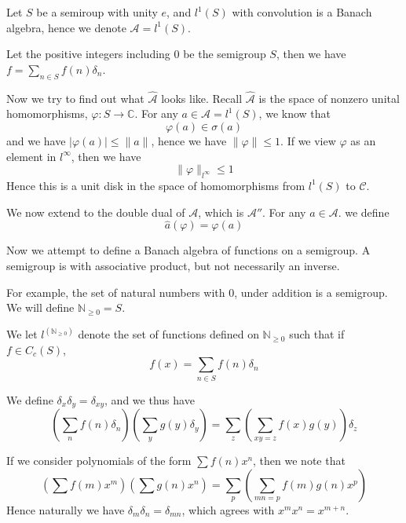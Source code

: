 Let $S$ be a semiroup with unity $e$, and $l^1(S)$ with convolution is a Banach algebra, hence we denote $\mathcal{A}=l^1(S)$.
\begin{example}
    Let the positive integers including 0 be the semigroup $S$, then we have $f=\sum_{n\in S}f(n)\delta_n$.
\end{example}
Now we try to find out what $\widehat{\mathcal{A}}$ looks like. Recall $\widehat{\mathcal{A}}$ is the space of nonzero unital homomorphisms, $\varphi:S\to\mathbb{C}$. For any $a\in\mathcal{A}=l^1(S)$, we know that
\begin{equation*}
    \varphi(a)\in\sigma(a)
\end{equation*}
and we have $|\varphi(a)|\leq\|a\|$, hence we have $\|\varphi\|\leq 1$. If we view $\varphi$ as an element in $l^\infty$, then we have
\begin{equation*}
    \|\varphi\|_{l^\infty}\leq 1
\end{equation*}
Hence this is a unit disk in the space of homomorphisms from $l^1(S)$ to $\mathcal{C}$.



We now extend to the double dual of $\mathcal{A}$, which is $\mathcal{A}''$. For any $a\in\mathcal{A}$. we define 
\begin{equation*}
    \widehat{a}(\varphi)=\varphi(a)
\end{equation*}


Now we attempt to define a Banach algebra of functions on a semigroup. A semigroup is with associative product, but not necessarily an inverse.


\begin{example}
    For example, the set of natural numbers with 0, under addition is a semigroup. We will define $\mathbb{N}_{\geq 0}=S$.
\end{example}

We let $l^(\mathbb{N}_{\geq 0})$ denote the set of functions defined on $\mathbb{N}_{\geq 0}$ such that if $f\in C_c(S)$,
\begin{equation*}
    f(x)=\sum_{n\in S}f(n)\delta_n
\end{equation*}

We define $\delta_x\delta_y=\delta_{xy}$, and we thus have
\begin{equation*}
    \left(\sum_nf(n)\delta_n\right)\left(\sum_yg(y)\delta_y \right)=\sum_z\left(\sum_{xy=z}f(x)g(y) \right)\delta_z
\end{equation*}

\begin{example}
    If we consider polynomials of the form $\sum f(n)x^n$, then we note that 
    \begin{equation*}
        \left(\sum f(m)x^m \right)\left(\sum g(n)x^n \right)=\sum_p\left(\sum_{mn=p}f(m)g(n)x^p \right)
    \end{equation*}
    Hence naturally we have $\delta_m\delta_n=\delta_{mn}$, which agrees with $x^mx^n=x^{m+n}$.
\end{example}

